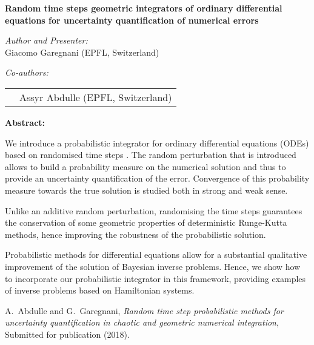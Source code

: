 \documentclass{article}
\begin{document}
\begin{center}
{\bf Random time steps geometric integrators of ordinary differential equations for uncertainty quantification of numerical errors}
\end{center}


\begin{center}
{\it Author and Presenter:} \\[0.5ex]
Giacomo Garegnani (EPFL, Switzerland)
\end{center}

\begin{center}
{\it Co-authors:}\\[0.5ex]
\begin{tabular}{ll}
& Assyr Abdulle (EPFL, Switzerland)\\
\end{tabular}
\end{center}

\bigskip\noindent

{\bf Abstract:} 

We introduce a probabilistic integrator for ordinary differential equations (ODEs) based on randomised time steps \cite{AbG18}. The random perturbation that is introduced allows to build a probability measure on the numerical solution and thus to provide an uncertainty quantification of the error. Convergence of this probability measure towards the true solution is studied both in strong and weak sense.

Unlike an additive random perturbation, randomising the time steps guarantees the conservation of some geometric properties of deterministic Runge-Kutta methods, hence improving the robustness of the probabilistic solution.

Probabilistic methods for differential equations allow for a substantial qualitative improvement of the solution of Bayesian inverse problems. Hence, we show how to incorporate our probabilistic integrator in this framework, providing examples of inverse problems based on Hamiltonian systems.

\bigskip\noindent

\begin{thebibliography}{1}
{\sc A.~Abdulle and G.~Garegnani}, {\em Random time step probabilistic methods
	for uncertainty quantification in chaotic and geometric numerical
	integration}, Submitted for publication (2018).
\end{thebibliography}
\end{document}
